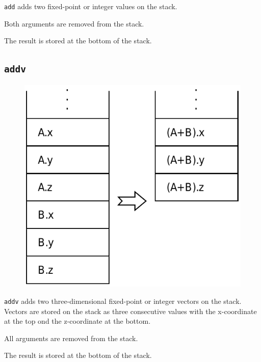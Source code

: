 			\texttt{add} adds two fixed-point or integer values on the stack.
			
			Both arguments are removed from the stack.
			
			The result is stored at the bottom of the stack.
	
	\qquad
	
	\subsection*{\texttt{addv}}
	
		\begin{figure}
			\begin{flushright}
				\includegraphics[width=\linewidth]{figure/pdf/i_addv} 
			\end{flushright}
		\end{figure}
	
			\texttt{addv} adds two three-dimensional fixed-point or integer
			vectors on the stack. Vectors are stored on the stack as three
			consecutive values with the x-coordinate at the top ond the
			z-coordinate at the bottom.
			
			All arguments are removed from the stack.
			
			The result is stored at the bottom of the stack.  \\
			\\
			\\

